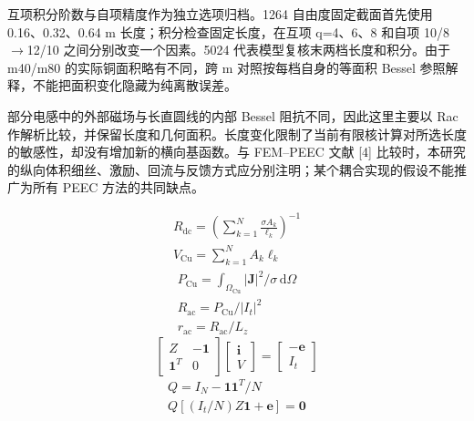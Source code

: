 \documentclass[journal,10pt]{IEEEtran}
\begin{document}
互项积分阶数与自项精度作为独立选项归档。1264 自由度固定截面首先使用 0.16、0.32、0.64 m 长度；积分检查固定长度，在互项 q=4、6、8 和自项 10/8\(\to\)12/10 之间分别改变一个因素。5024 代表模型复核末两档长度和积分。由于 m40/m80 的实际铜面积略有不同，跨 m 对照按每档自身的等面积 Bessel 参照解释，不能把面积变化隐藏为纯离散误差。


部分电感中的外部磁场与长直圆线的内部 Bessel 阻抗不同，因此这里主要以 Rac 作解析比较，并保留长度和几何面积。长度变化限制了当前有限核计算对所选长度的敏感性，却没有增加新的横向基函数。与 FEM–PEEC 文献 [4] 比较时，本研究的纵向体积细丝、激励、回流与反馈方式应分别注明；某个耦合实现的假设不能推广为所有 PEEC 方法的共同缺点。


\hypertarget{E01}{}
\begin{equation}
\begin{gathered}
R_{\mathrm{dc}}=\left(\sum_{k=1}^{N}\frac{\sigma A_k}{\ell_k}\right)^{-1} \\
V_{\mathrm{Cu}}=\sum_{k=1}^{N}A_k\ell_k
\end{gathered}
\tag{1}\label{eq:E01}
\end{equation}
\hypertarget{E02}{}
\begin{equation}
\begin{gathered}
P_{\mathrm{Cu}}=\int_{\Omega_{\mathrm{Cu}}}|\mathbf J|^2/\sigma\,\mathrm d\Omega \\
R_{\mathrm{ac}}=P_{\mathrm{Cu}}/|I_t|^2 \\
r_{\mathrm{ac}}=R_{\mathrm{ac}}/L_z
\end{gathered}
\tag{2}\label{eq:E02}
\end{equation}
\hypertarget{E04}{}\begin{equation}\begin{bmatrix} Z&-\mathbf1\\ \mathbf1^T&0\end{bmatrix}\begin{bmatrix}\mathbf i\\V\end{bmatrix}=\begin{bmatrix}-\mathbf e\\I_t\end{bmatrix}\tag{3}\label{eq:E04}\end{equation}
\hypertarget{E05}{}
\begin{equation}
\begin{gathered}
Q=I_N-\mathbf1\mathbf1^T/N \\
Q\left[(I_t/N)Z\mathbf1+\mathbf e\right]=\mathbf0
\end{gathered}
\tag{4}\label{eq:E05}
\end{equation}
\end{document}
